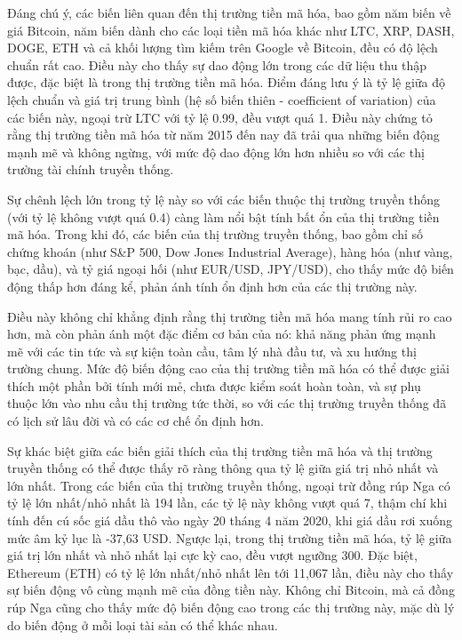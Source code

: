 \clearpage

Đáng chú ý, các biến liên quan đến thị trường tiền mã hóa, bao gồm năm biến về giá Bitcoin, năm biến dành cho các loại tiền mã hóa khác như LTC, XRP, DASH, DOGE, ETH và cả khối lượng tìm kiếm trên Google về Bitcoin, đều có độ lệch chuẩn rất cao. Điều này cho thấy sự dao động lớn trong các dữ liệu thu thập được, đặc biệt là trong thị trường tiền mã hóa. Điểm đáng lưu ý là tỷ lệ giữa độ lệch chuẩn và giá trị trung bình (hệ số biến thiên - coefficient of variation) của các biến này, ngoại trừ LTC với tỷ lệ 0.99, đều vượt quá 1. Điều này chứng tỏ rằng thị trường tiền mã hóa từ năm 2015 đến nay đã trải qua những biến động mạnh mẽ và không ngừng, với mức độ dao động lớn hơn nhiều so với các thị trường tài chính truyền thống.

Sự chênh lệch lớn trong tỷ lệ này so với các biến thuộc thị trường truyền thống (với tỷ lệ không vượt quá 0.4) càng làm nổi bật tính bất ổn của thị trường tiền mã hóa. Trong khi đó, các biến của thị trường truyền thống, bao gồm chỉ số chứng khoán (như S\&P 500, Dow Jones Industrial Average), hàng hóa (như vàng, bạc, dầu), và tỷ giá ngoại hối (như EUR/USD, JPY/USD), cho thấy mức độ biến động thấp hơn đáng kể, phản ánh tính ổn định hơn của các thị trường này.

Điều này không chỉ khẳng định rằng thị trường tiền mã hóa mang tính rủi ro cao hơn, mà còn phản ánh một đặc điểm cơ bản của nó: khả năng phản ứng mạnh mẽ với các tin tức và sự kiện toàn cầu, tâm lý nhà đầu tư, và xu hướng thị trường chung. Mức độ biến động cao của thị trường tiền mã hóa có thể được giải thích một phần bởi tính mới mẻ, chưa được kiểm soát hoàn toàn, và sự phụ thuộc lớn vào nhu cầu thị trường tức thời, so với các thị trường truyền thống đã có lịch sử lâu đời và có các cơ chế ổn định hơn.

Sự khác biệt giữa các biến giải thích của thị trường tiền mã hóa và thị trường truyền thống có thể được thấy rõ ràng thông qua tỷ lệ giữa giá trị nhỏ nhất và lớn nhất. Trong các biến của thị trường truyền thống, ngoại trừ đồng rúp Nga có tỷ lệ lớn nhất/nhỏ nhất là 194 lần, các tỷ lệ này không vượt quá 7, thậm chí khi tính đến cú sốc giá dầu thô vào ngày 20 tháng 4 năm 2020, khi giá dầu rơi xuống mức âm kỷ lục là -37,63 USD. Ngược lại, trong thị trường tiền mã hóa, tỷ lệ giữa giá trị lớn nhất và nhỏ nhất lại cực kỳ cao, đều vượt ngưỡng 300. Đặc biệt, Ethereum (ETH) có tỷ lệ lớn nhất/nhỏ nhất lên tới 11,067 lần, điều này cho thấy sự biến động vô cùng mạnh mẽ của đồng tiền này. Không chỉ Bitcoin, mà cả đồng rúp Nga cũng cho thấy mức độ biến động cao trong các thị trường này, mặc dù lý do biến động ở mỗi loại tài sản có thể khác nhau.

